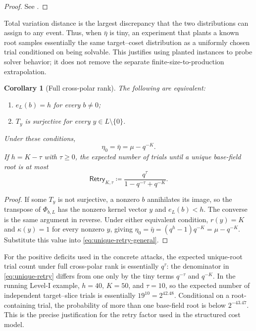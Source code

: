 \documentclass[11pt]{article}
\newtheorem{corollary}[corollary]{Corollary}
\begin{document}
\begin{proof}
See .
\end{proof}

Total variation distance is the largest discrepancy that the two distributions
can assign to any event.  Thus, when $\bar\eta$ is tiny, an experiment that
plants a known root samples essentially the same target--coset distribution as
a uniformly chosen trial conditioned on being solvable.  This justifies using
planted instances to probe solver behavior; it does not remove the separate
finite-size-to-production extrapolation.

\begin{corollary}[Full cross-polar rank]\label{cor:full-cross-rank}
The following are equivalent:
\begin{enumerate}[label=(\roman*)]
\item $e_L(b)=h$ for every $b\ne0$;
\item $T_y$ is surjective for every $y\in L\setminus\{0\}$.
\end{enumerate}
Under these conditions,
\[
 \eta_0=\bar\eta=\mu-q^{-K}.
\]
If $h=K-\tau$ with $\tau\ge0$, the expected number of trials until a unique
base-field root is at most
\begin{equation}\label{eq:unique-retry}
 \mathsf{Retry}_{K,\tau}\coloneqq
 \frac{q^\tau}{1-q^{-\tau}+q^{-K}}.
\end{equation}
\end{corollary}

\begin{proof}
If some $T_y$ is not surjective, a nonzero $b$ annihilates its image, so the
transpose of $\Phi_{b,L}$ has the nonzero kernel vector $y$ and $e_L(b)<h$.  The
converse is the same argument in reverse.  Under either equivalent condition,
$r(y)=K$ and $\kappa(y)=1$ for every nonzero $y$, giving
$\eta_0=\bar\eta=(q^h-1)q^{-K}=\mu-q^{-K}$.  Substitute this value into
\eqref{eq:unique-retry-general}.
\end{proof}

For the positive deficits used in the concrete attacks, the expected
unique-root trial count under full cross-polar rank is essentially $q^\tau$:
the denominator in \eqref{eq:unique-retry} differs from one only by the tiny
terms $q^{-\tau}$ and $q^{-K}$.  In the running Level-I example, $h=40$, $K=50$,
and $\tau=10$, so the expected number of independent target--slice trials is
essentially $19^{10}=2^{42.48}$.  Conditional on a root-containing trial, the
probability of more than one base-field root is below $2^{-43.47}$.  This is
the precise justification for the retry factor used in the structured cost
model.
\end{document}
